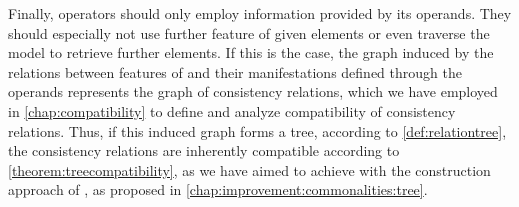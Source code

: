 Finally, operators should only employ information provided by its operands.
They should especially not use further feature of given elements or even traverse the model to retrieve further elements.
If this is the case, the graph induced by the relations between features of \commonalities and their manifestations defined through the operands represents the graph of consistency relations, which we have employed in \autoref{chap:compatibility} to define and analyze compatibility of consistency relations.
Thus, if this induced graph forms a tree, according to \autoref{def:relationtree}, the consistency relations are inherently compatible according to \autoref{theorem:treecompatibility}, as we have aimed to achieve with the construction approach of \commonalities, as proposed in \autoref{chap:improvement:commonalities:tree}.







